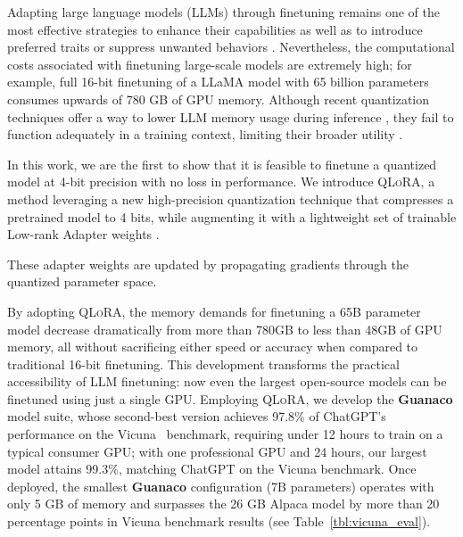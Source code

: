 Adapting large language models (LLMs) through finetuning remains one of the most effective strategies to enhance their capabilities \citep{min2021metaicl, wei2021finetuned, ouyang2022training, wang2022super, wang2022self, liu2022few} as well as to introduce preferred traits or suppress unwanted behaviors \citep{ouyang2022training,askell2021general,bai2022training}. Nevertheless, the computational costs associated with finetuning large-scale models are extremely high; for example, full 16-bit finetuning of a LLaMA model with 65 billion parameters~\citep{touvron2023llama} consumes upwards of 780 GB of GPU memory. Although recent quantization techniques offer a way to lower LLM memory usage during inference \citep{dettmers2022llm, dettmers2022case, frantar2022gptq, xiao2022smoothquant}, they fail to function adequately in a training context, limiting their broader utility \citep{wortsman2023stable}.

In this work, we are the first to show that it is feasible to finetune a quantized model at 4-bit precision with no loss in performance. We introduce \textsc{QLoRA}, a method leveraging a new high-precision quantization technique that compresses a pretrained model to 4 bits, while augmenting it with a lightweight set of trainable Low-rank Adapter weights \citep{hu2021lora}. 

These adapter weights are updated by propagating gradients through the quantized parameter space.

By adopting \textsc{QLoRA}, the memory demands for finetuning a 65B parameter model decrease dramatically from more than 780GB to less than 48GB of GPU memory, all without sacrificing either speed or accuracy when compared to traditional 16-bit finetuning. This development transforms the practical accessibility of LLM finetuning: now even the largest open-source models can be finetuned using just a single GPU. Employing \textsc{QLoRA}, we develop the \textbf{Guanaco} model suite, whose second-best version achieves 97.8\% of ChatGPT's performance on the Vicuna~\citep{vicuna2023} benchmark, requiring under 12 hours to train on a typical consumer GPU; with one professional GPU and 24 hours, our largest model attains 99.3\%, matching ChatGPT on the Vicuna benchmark. Once deployed, the smallest \textbf{Guanaco} configuration (7B parameters) operates with only 5 GB of memory and surpasses the 26 GB Alpaca model by more than 20 percentage points in Vicuna benchmark results (see Table~\ref{tbl:vicuna_eval}).

